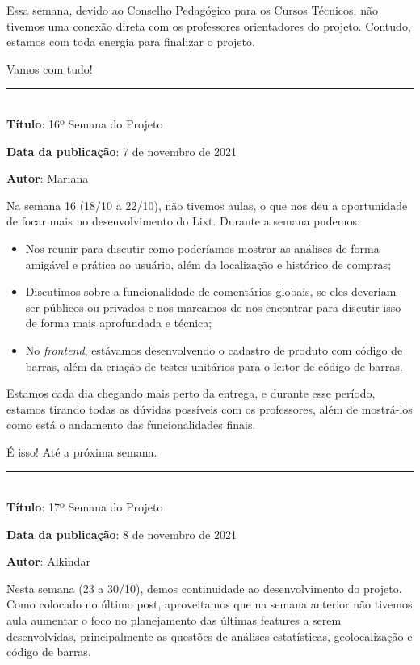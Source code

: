 Essa semana, devido ao Conselho Pedagógico para os Cursos Técnicos, não tivemos uma conexão direta com os professores orientadores do projeto. Contudo, estamos com toda energia para finalizar o projeto.

Vamos com tudo! \\

\protect\rule{13cm}{.5pt}
\\

\textbf{Título}: 16º Semana do Projeto

\textbf{Data da publicação}: 7 de novembro de 2021

\textbf{Autor}: Mariana

Na semana 16 (18/10 a 22/10), não tivemos aulas, o que nos deu a oportunidade de focar mais no desenvolvimento do Lixt. Durante a semana pudemos:

\begin{itemize}
	\item Nos reunir para discutir como poderíamos mostrar as análises de forma amigável e prática ao usuário, além da localização e histórico de compras;
	\item Discutimos sobre a funcionalidade de comentários globais, se eles deveriam ser públicos ou privados e nos marcamos de nos encontrar para discutir isso de forma mais aprofundada e técnica;
	\item No \textit{\gls{frontend}}, estávamos desenvolvendo o cadastro de produto com código de barras, além da criação de testes unitários para o leitor de código de barras.
\end{itemize}

Estamos cada dia chegando mais perto da entrega, e durante esse período, estamos tirando todas as dúvidas possíveis com os professores, além de mostrá-los como está o andamento das funcionalidades finais.

É isso! Até a próxima semana.  \\

\protect\rule{13cm}{.5pt}
\\

\textbf{Título}: 17º Semana do Projeto

\textbf{Data da publicação}: 8 de novembro de 2021

\textbf{Autor}: Alkindar

Nesta semana (23 a 30/10), demos continuidade ao desenvolvimento do projeto. Como colocado no último post, aproveitamos que na semana anterior não tivemos aula aumentar o foco no planejamento das últimas features a serem desenvolvidas, principalmente as questões de análises estatísticas, geolocalização e código de barras. 

